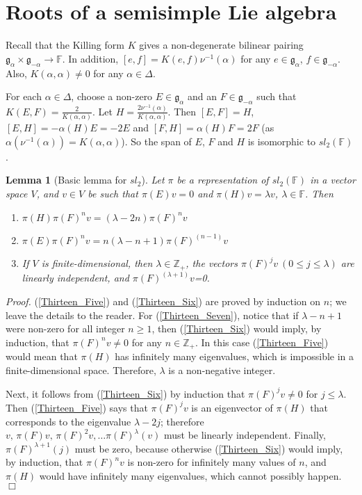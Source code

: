 \documentclass{article}
\newtheorem{lemma}[prop]{Lemma}
\begin{document}
\section{Roots of a semisimple Lie algebra}
Recall that the Killing form $K$ gives a non-degenerate bilinear pairing ${\mathfrak g}_\alpha \times {\mathfrak g}_{-\alpha} \to \mathbb{F}$. In addition, $[e, f]=K(e, f)\nu^{-1}(\alpha)$ for any $e \in {\mathfrak g}_\alpha$, $f \in {\mathfrak g}_{-\alpha}$. Also, $K(\alpha, \alpha)\neq 0$ for any $\alpha \in \Delta$.

For each $\alpha \in \Delta$, choose a non-zero $E \in {\mathfrak g}_\alpha$ and an $F \in {\mathfrak g}_{-\alpha}$ such that $K(E, F) = \frac{2}{K(\alpha, \alpha)}$. Let $H = \frac{2 \nu^{-1}(\alpha)}{K(\alpha, \alpha)}$. Then $[E, F]=H$, $[E, H] = -\alpha(H)E = -2E$ and $[F, H]=\alpha(H)F = 2F$ (as $\alpha (\nu^{-1}(\alpha)) = K(\alpha, \alpha)$). So the span of $E$, $F$ and $H$ is isomorphic to $sl_2 (\mathbb{F})$.

\begin{lemma}[Basic lemma for $sl_2$] Let $\pi$ be a representation of $sl_2(\mathbb{F})$ in a vector space $V$, and $v \in V$ be such that $\pi (E)v = 0$ and $\pi (H) v = \lambda v$, $\lambda \in \mathbb{F}$. Then 
\begin{enumerate}
\item \label{Thirteen_Five}$\pi (H) \pi (F)^n v = (\lambda - 2n) \pi (F)^n v$
\item \label{Thirteen_Six} $\pi(E) \pi (F)^n v = n(\lambda - n + 1) \pi (F)^{(n-1)}v$
\item \label{Thirteen_Seven} If $V$ is finite-dimensional, then $\lambda \in \mathbb{Z}_+$, the vectors $\pi(F)^j v \ (0 \leq j \leq \lambda)$ are linearly independent, and $\pi(F)^{(\lambda + 1)}v$=0.
\end{enumerate}
\end{lemma}

\emph{Proof.} (\ref{Thirteen_Five}) and (\ref{Thirteen_Six}) are proved by induction on $n$; we leave the details to the reader. For (\ref{Thirteen_Seven}), notice that if $\lambda - n + 1$ were non-zero for all integer $n \geq 1$, then (\ref{Thirteen_Six}) would imply, by induction, that $\pi (F)^n v \neq 0$ for any $n \in \mathbb{Z}_+$. In this case (\ref{Thirteen_Five}) would mean that $\pi (H)$ has infinitely many eigenvalues, which is impossible in a finite-dimensional space. Therefore, $\lambda$ is a non-negative integer.

Next, it follows from (\ref{Thirteen_Six}) by induction that $\pi (F)^j v \neq 0$ for $j \leq \lambda$. Then (\ref{Thirteen_Five}) says that $\pi (F)^j v$ is an eigenvector of $\pi(H)$ that corresponds to the eigenvalue $\lambda - 2j$; therefore $v,\, \pi(F)v,\, \pi(F)^2v, \ldots \pi(F)^\lambda(v)$ must be linearly independent. Finally, $\pi(F)^{\lambda + 1}(j)$ must be zero, because otherwise (\ref{Thirteen_Six}) would imply, by induction, that $\pi (F)^n v$ is non-zero for infinitely many values of $n$, and $\pi(H)$ would have infinitely many eigenvalues, which cannot possibly happen. \hfill $\Box$
\end{document}
